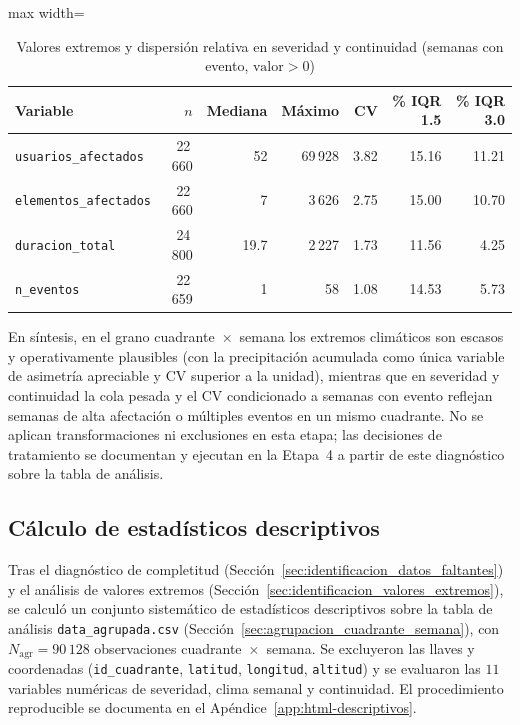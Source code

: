 \begin{table}[!htbp]
\centering
    \small
    \caption{Valores extremos y dispersión relativa en severidad y continuidad (semanas con evento, $\text{valor} > 0$)}
    \label{tab:extremos_evento_agrupada}
    \begin{adjustbox}{max width=\linewidth}
\begin{tabular}{l r r r r r r}
    \toprule
    \textbf{Variable} & \textbf{$n$} & \textbf{Mediana} & \textbf{Máximo} & \textbf{CV} & \textbf{\% IQR 1.5} & \textbf{\% IQR 3.0} \\
    \midrule
    \texttt{usuarios\_afectados}  & 22\,660 & 52    & 69\,928 & 3.82 & 15.16 & 11.21 \\
    \texttt{elementos\_afectados} & 22\,660 & 7     & 3\,626  & 2.75 & 15.00 & 10.70 \\
    \texttt{duracion\_total}      & 24\,800 & 19.7  & 2\,227  & 1.73 & 11.56 & 4.25  \\
    \texttt{n\_eventos}            & 22\,659 & 1     & 58       & 1.08 & 14.53 & 5.73  \\
    \bottomrule
    \end{tabular}
\end{adjustbox}
    \end{table}
    
    
    
    \noindent En síntesis, en el grano cuadrante~$\times$~semana los extremos climáticos son escasos y operativamente plausibles (con la precipitación acumulada como única variable de asimetría apreciable y CV superior a la unidad), mientras que en severidad y continuidad la cola pesada y el CV condicionado a semanas con evento reflejan semanas de alta afectación o múltiples eventos en un mismo cuadrante. No se aplican transformaciones ni exclusiones en esta etapa; las decisiones de tratamiento se documentan y ejecutan en la Etapa~4 a partir de este diagnóstico sobre la tabla de análisis.
    
\subsection{Cálculo de estadísticos descriptivos}
\label{sec:estadisticos_descriptivos}
    Tras el diagnóstico de completitud (Sección~\ref{sec:identificacion_datos_faltantes}) y el análisis de valores extremos (Sección~\ref{sec:identificacion_valores_extremos}), se calculó un conjunto sistemático de estadísticos descriptivos sobre la tabla de análisis \texttt{data\_agrupada.csv} (Sección~\ref{sec:agrupacion_cuadrante_semana}), con $N_{\mathrm{agr}} = 90\,128$ observaciones cuadrante~$\times$~semana. Se excluyeron las llaves y coordenadas (\texttt{id\_cuadrante}, \texttt{latitud}, \texttt{longitud}, \texttt{altitud}) y se evaluaron las $11$ variables numéricas de severidad, clima semanal y continuidad. El procedimiento reproducible se documenta en el Apéndice~\ref{app:html-descriptivos}.
    
